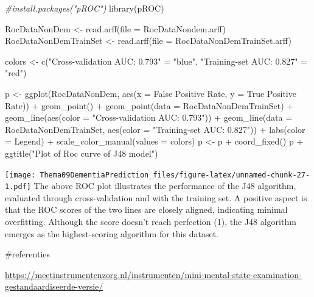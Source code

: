 \documentclass[
]{article}
\newenvironment{Shaded}{\begin{snugshade}}{\end{snugshade}}
\newcommand{\AttributeTok}[1]{\textcolor[rgb]{0.77,0.63,0.00}{#1}}
\newcommand{\CommentTok}[1]{\textcolor[rgb]{0.56,0.35,0.01}{\textit{#1}}}
\newcommand{\FunctionTok}[1]{\textcolor[rgb]{0.00,0.00,0.00}{#1}}
\newcommand{\NormalTok}[1]{#1}
\newcommand{\OtherTok}[1]{\textcolor[rgb]{0.56,0.35,0.01}{#1}}
\newcommand{\SpecialCharTok}[1]{\textcolor[rgb]{0.00,0.00,0.00}{#1}}
\newcommand{\StringTok}[1]{\textcolor[rgb]{0.31,0.60,0.02}{#1}}
\begin{document}
\begin{Shaded}
\begin{Highlighting}[]
\CommentTok{\#install.packages("pROC")}
\FunctionTok{library}\NormalTok{(pROC)}

\NormalTok{RocDataNonDem }\OtherTok{\textless{}{-}} \FunctionTok{read.arff}\NormalTok{(}\AttributeTok{file =} \StringTok{\textquotesingle{}RocDataNondem.arff\textquotesingle{}}\NormalTok{)}
\NormalTok{RocDataNonDemTrainSet }\OtherTok{\textless{}{-}} \FunctionTok{read.arff}\NormalTok{(}\AttributeTok{file =} \StringTok{\textquotesingle{}RocDataNonDemTrainSet.arff\textquotesingle{}}\NormalTok{)}

\NormalTok{colors }\OtherTok{\textless{}{-}} \FunctionTok{c}\NormalTok{(}\StringTok{"Cross{-}validation AUC: 0.793"} \OtherTok{=} \StringTok{"blue"}\NormalTok{, }\StringTok{"Training{-}set AUC: 0.827"} \OtherTok{=} \StringTok{"red"}\NormalTok{)}

\NormalTok{p }\OtherTok{\textless{}{-}} \FunctionTok{ggplot}\NormalTok{(RocDataNonDem, }\FunctionTok{aes}\NormalTok{(}\AttributeTok{x =} \StringTok{\textasciigrave{}}\AttributeTok{False Positive Rate}\StringTok{\textasciigrave{}}\NormalTok{, }\AttributeTok{y =} \StringTok{\textasciigrave{}}\AttributeTok{True Positive Rate}\StringTok{\textasciigrave{}}\NormalTok{)) }\SpecialCharTok{+} \FunctionTok{geom\_point}\NormalTok{() }\SpecialCharTok{+} \FunctionTok{geom\_point}\NormalTok{(}\AttributeTok{data =}\NormalTok{ RocDataNonDemTrainSet) }\SpecialCharTok{+} \FunctionTok{geom\_line}\NormalTok{(}\FunctionTok{aes}\NormalTok{(}\AttributeTok{color =} \StringTok{"Cross{-}validation AUC: 0.793"}\NormalTok{)) }\SpecialCharTok{+} \FunctionTok{geom\_line}\NormalTok{(}\AttributeTok{data =}\NormalTok{ RocDataNonDemTrainSet, }\FunctionTok{aes}\NormalTok{(}\AttributeTok{color =} \StringTok{"Training{-}set AUC: 0.827"}\NormalTok{)) }\SpecialCharTok{+}
  \FunctionTok{labs}\NormalTok{(}\AttributeTok{color =} \StringTok{\textquotesingle{}Legend\textquotesingle{}}\NormalTok{) }\SpecialCharTok{+} \FunctionTok{scale\_color\_manual}\NormalTok{(}\AttributeTok{values =}\NormalTok{ colors)}
\NormalTok{p }\OtherTok{\textless{}{-}}\NormalTok{ p }\SpecialCharTok{+} \FunctionTok{coord\_fixed}\NormalTok{()}
\NormalTok{p }\SpecialCharTok{+} \FunctionTok{ggtitle}\NormalTok{(}\StringTok{"Plot of Roc curve of J48 model"}\NormalTok{)}
\end{Highlighting}
\end{Shaded}

\texttt{[image: Thema09DementiaPrediction\_files/figure-latex/unnamed-chunk-27-1.pdf]}
The above ROC plot illustrates the performance of the J48 algorithm,
evaluated through cross-validation and with the training set. A positive
aspect is that the ROC scores of the two lines are closely aligned,
indicating minimal overfitting. Although the score doesn't reach
perfection (1), the J48 algorithm emerges as the highest-scoring
algorithm for this dataset.

\#referenties

\url{https://meetinstrumentenzorg.nl/instrumenten/mini-mental-state-examination-gestandaardiseerde-versie/}
\end{document}
